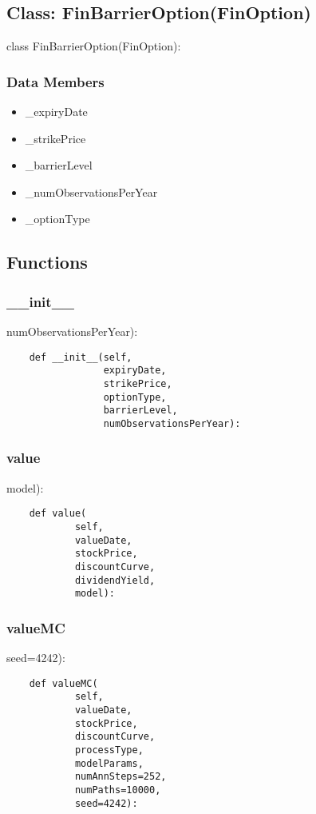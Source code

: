 \documentclass[twoside,11pt]{book}
\begin{document}
\subsection*{Class: FinBarrierOption(FinOption)}
class FinBarrierOption(FinOption): 

\subsubsection*{Data Members}
\begin{itemize}
\item{\_expiryDate}
\item{\_strikePrice}
\item{\_barrierLevel}
\item{\_numObservationsPerYear}
\item{\_optionType}
\end{itemize}

\subsection*{Functions}

\subsubsection*{{\bf \_\_init\_\_}}
numObservationsPerYear): 

\begin{lstlisting}
    def __init__(self,
                 expiryDate,
                 strikePrice,
                 optionType,
                 barrierLevel,
                 numObservationsPerYear):
\end{lstlisting}

\subsubsection*{{\bf value}}
model): 

\begin{lstlisting}
    def value(
            self,
            valueDate,
            stockPrice,
            discountCurve,
            dividendYield,
            model):
\end{lstlisting}

\subsubsection*{{\bf valueMC}}
seed=4242): 

\begin{lstlisting}
    def valueMC(
            self,
            valueDate,
            stockPrice,
            discountCurve,
            processType,
            modelParams,
            numAnnSteps=252,
            numPaths=10000,
            seed=4242):
\end{lstlisting}
\end{document}
